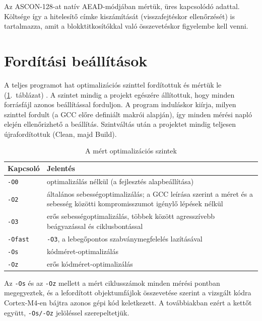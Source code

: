 \documentclass[a4paper,12pt]{report}
\theoremstyle{definition}
\theoremstyle{remark}
\begin{document}
Az ASCON-128-at natív AEAD-módjában mértük, üres kapcsolódó adattal. Költsége így a hitelesítő címke kiszámítását (visszafejtéskor ellenőrzését) is tartalmazza, amit a blokktitkosítókkal való összevetéskor figyelembe kell venni.

\section{Fordítási beállítások}\label{sec:forditas}

A teljes programot hat optimalizációs szinttel fordítottuk és mértük le (\ref{tab:build_config}.~táblázat) \cite{GCCopt}. A szintet mindig a projekt egészére állítottuk, hogy minden forrásfájl azonos beállítással forduljon. A program induláskor kiírja, milyen szinttel fordult (a GCC előre definiált makrói alapján), így minden mérési napló elején ellenőrizhető a beállítás. Szintváltás után a projektet mindig teljesen újrafordítottuk (Clean, majd Build).

\begin{table}[htbp]
    \centering
    \small
    \caption{A mért optimalizációs szintek}
    \label{tab:build_config}
    \begin{tabular}{|l|p{11cm}|}
        \hline
        \textbf{Kapcsoló} & \textbf{Jelentés} \\ \hline
        \texttt{-O0} & optimalizálás nélkül (a fejlesztés alapbeállítása) \\ \hline
        \texttt{-O2} & általános sebességoptimalizálás; a GCC leírása szerint a méret és a sebesség közötti kompromisszumot igénylő lépések nélkül \\ \hline
        \texttt{-O3} & erős sebességoptimalizálás, többek között agresszívebb beágyazással és ciklusbontással \\ \hline
        \texttt{-Ofast} & \texttt{-O3}, a lebegőpontos szabványmegfelelés lazításával \\ \hline
        \texttt{-Os} & kódméret-optimalizálás \\ \hline
        \texttt{-Oz} & erős kódméret-optimalizálás \\ \hline
    \end{tabular}
\end{table}

Az \texttt{-Os} és az \texttt{-Oz} mellett a mért ciklusszámok minden mérési pontban megegyeztek, és a lefordított objektumfájlok összevetése szerint a vizsgált kódra Cortex-M4-en bájtra azonos gépi kód keletkezett. A továbbiakban ezért a kettőt együtt, \texttt{-Os/-Oz} jelöléssel szerepeltetjük.
\end{document}
